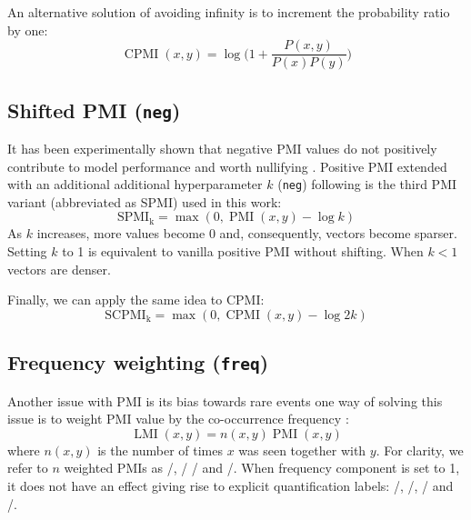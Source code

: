 \documentclass[11pt,letterpaper]{article}
\begin{document}
An alternative solution of avoiding infinity is to increment the probability ratio by one:
%
\begin{equation}
  \label{eq:cpmi}
  \operatorname{CPMI}(x, y) = \log\Big( 1 + \frac{P(x,y)}{P(x)P(y)} \Big)
\end{equation}

\subsection{Shifted PMI (\texttt{neg})}
\label{sec:shifted-pmi}

It has been experimentally shown that negative PMI values do not positively contribute to model performance and worth nullifying \cite{Turney:2010:FMV:1861751.1861756}. Positive PMI extended with an additional additional hyperparameter $k$ (\texttt{neg}) following  is the third PMI variant (abbreviated as SPMI) used in this work:
%
\begin{equation}
  \label{eq:ppmi}
  \operatorname{SPMI_k} = \max (0, \operatorname{PMI}(x, y) - \log k)
\end{equation}
%
As $k$ increases, more values become 0 and, consequently, vectors become sparser. Setting $k$ to 1 is equivalent to vanilla positive PMI without shifting. When $k < 1$ vectors are denser.

Finally, we can apply the same idea to CPMI:
%
\begin{equation}
  \label{eq:pcpmi}
  \operatorname{SCPMI_k} = \max (0, \operatorname{CPMI}(x, y) - \log 2k)
\end{equation}

\subsection{Frequency weighting (\texttt{freq})}
\label{sec:frequency-weighting}

Another issue with PMI is its bias towards rare events \cite{TACL570} one way of solving this issue is to weight PMI value by the co-occurrence frequency \cite{Evert05}:
%
\begin{equation}
  \label{eq:lmi}
  \operatorname{LMI}(x, y) = n(x, y)\operatorname{PMI}(x, y)
\end{equation}
%
where $n(x, y)$ is the number of times $x$ was seen together with $y$. For clarity, we refer to $n$ weighted PMIs as \NPMI/, \NSPMI/ \NCPMI/ and \NSCPMI/. When frequency component is set to 1, it does not have an effect giving rise to explicit quantification labels: \PMI/, \SPMI/, \CPMI/ and \SCPMI/.
\end{document}
